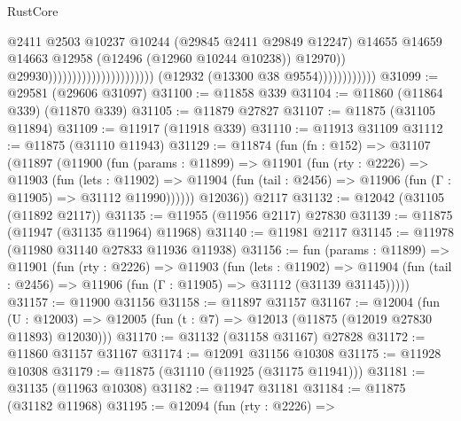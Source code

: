\begin{lexlean}{RustCore}
\begin{coremodule}
                                                                        @2411
                                                                        @2503
                                                                        @10237
                                                                        @10244
                                                                        (@29845 @2411 @29849 @12247)
                                                                        @14655
                                                                        @14659
                                                                        @14663
                                                                        @12958
                                                                        (@12496
                                                                          (@12960 @10244 @10238))
                                                                        @12970))
                                                                    @29930))))))))))))))))))))))
                        (@12932 (@13300 @38 @9554))))))))))))
@31099 := @29581 (@29606 @31097)
@31100 := @11858 @339
@31104 := @11860 (@11864 @339) (@11870 @339)
@31105 := @11879 @27827
@31107 := @11875 (@31105 @11894)
@31109 := @11917 (@11918 @339)
@31110 := @11913 @31109
@31112 := @11875 (@31110 @11943)
@31129 := @11874
    (fun (fn : @152) =>
    @31107
      (@11897
        (@11900
          (fun (params : @11899) =>
          @11901
            (fun (rty : @2226) =>
            @11903
              (fun (lets : @11902) =>
              @11904 (fun (tail : @2456) => @11906 (fun (Γ : @11905) => @31112 @11990))))))
        @12036))
    @2117
@31132 := @12042 (@31105 (@11892 @2117))
@31135 := @11955 (@11956 @2117) @27830
@31139 := @11875 (@11947 (@31135 @11964) @11968)
@31140 := @11981 @2117
@31145 := @11978 (@11980 @31140 @27833 @11936 @11938)
@31156 := fun (params : @11899) =>
  @11901
    (fun (rty : @2226) =>
    @11903
      (fun (lets : @11902) =>
      @11904 (fun (tail : @2456) => @11906 (fun (Γ : @11905) => @31112 (@31139 @31145)))))
@31157 := @11900 @31156
@31158 := @11897 @31157
@31167 := @12004
    (fun (U : @12003) => @12005 (fun (t : @7) => @12013 (@11875 (@12019 @27830 @11893) @12030)))
@31170 := @31132 (@31158 @31167) @27828
@31172 := @11860 @31157 @31167
@31174 := @12091 @31156 @10308
@31175 := @11928 @10308
@31179 := @11875 (@31110 (@11925 (@31175 @11941)))
@31181 := @31135 (@11963 @10308)
@31182 := @11947 @31181
@31184 := @11875 (@31182 @11968)
@31195 := @12094
    (fun (rty : @2226) =>

\end{coremodule}
\end{lexlean}
